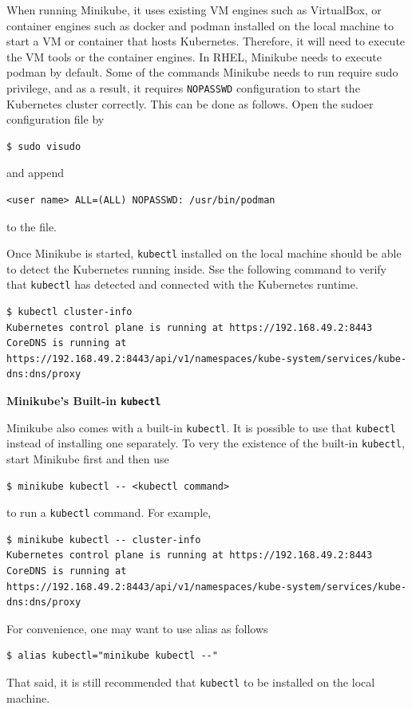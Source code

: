 When running Minikube, it uses existing VM engines such as VirtualBox, or container engines such as docker and podman installed on the local machine to start a VM or container that hosts Kubernetes. Therefore, it will need to execute the VM tools or the container engines. In RHEL, Minikube needs to execute podman by default. Some of the commands Minikube needs to run require sudo privilege, and as a result, it requires \verb|NOPASSWD| configuration to start the Kubernetes cluster correctly. This can be done as follows. Open the sudoer configuration file by
\begin{lstlisting}
$ sudo visudo
\end{lstlisting}
and append
\begin{lstlisting}
<user name> ALL=(ALL) NOPASSWD: /usr/bin/podman
\end{lstlisting}
to the file.

Once Minikube is started, \verb|kubectl| installed on the local machine should be able to detect the Kubernetes running inside. Sse the following command to verify that \verb|kubectl| has detected and connected with the Kubernetes runtime.
\begin{lstlisting}
$ kubectl cluster-info
Kubernetes control plane is running at https://192.168.49.2:8443
CoreDNS is running at https://192.168.49.2:8443/api/v1/namespaces/kube-system/services/kube-dns:dns/proxy
\end{lstlisting}

\begin{mdframed}
\noindent \textbf{Minikube's Built-in \texttt{kubectl}}

Minikube also comes with a built-in \verb|kubectl|. It is possible to use that \verb|kubectl| instead of installing one separately. To very the existence of the built-in \verb|kubectl|, start Minikube first and then use
\begin{lstlisting}
$ minikube kubectl -- <kubectl command>
\end{lstlisting}
to run a \verb|kubectl| command. For example,
\begin{lstlisting}
$ minikube kubectl -- cluster-info
Kubernetes control plane is running at https://192.168.49.2:8443
CoreDNS is running at https://192.168.49.2:8443/api/v1/namespaces/kube-system/services/kube-dns:dns/proxy
\end{lstlisting}
For convenience, one may want to use alias as follows
\begin{lstlisting}
$ alias kubectl="minikube kubectl --"
\end{lstlisting}

That said, it is still recommended that \verb|kubectl| to be installed on the local machine. 
\end{mdframed}

